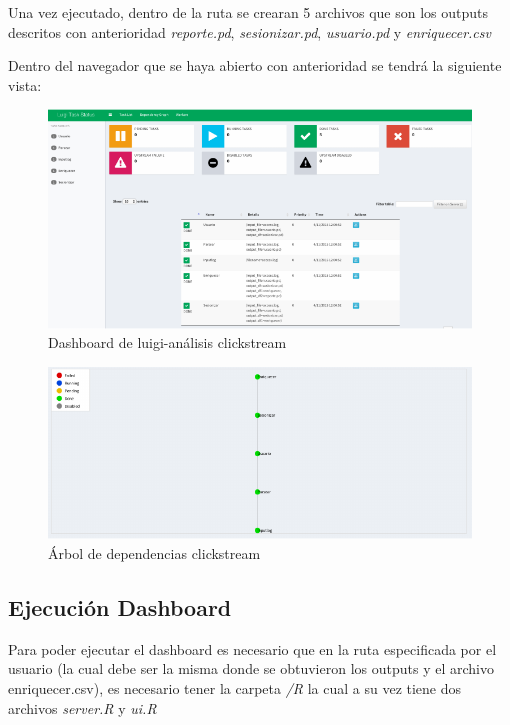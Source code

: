 Una vez ejecutado, dentro de la ruta se crearan 5 archivos que son los
outputs descritos con anterioridad \emph{reporte.pd},
\emph{sesionizar.pd}, \emph{usuario.pd} y \emph{enriquecer.csv}

Dentro del navegador que se haya abierto con anterioridad se tendrá la siguiente vista:

\begin{figure}[H]
\centering
\includegraphics[width=1\textwidth]{Figures/unnamed-chunk-2-1}
\caption{Dashboard de luigi-análisis clickstream}
\end{figure}

\begin{figure}[H]
\centering
\includegraphics[width=1\textwidth]{Figures/unnamed-chunk-3-1}
\caption{Árbol de dependencias clickstream}
\end{figure}



\subsection{ Ejecución Dashboard}\label{ejecucion-dashboard}

Para poder ejecutar el dashboard es necesario que en la ruta
especificada por el usuario (la cual debe ser la misma donde se
obtuvieron los outputs y el archivo enriquecer.csv), es necesario tener
la carpeta \emph{/R} la cual a su vez tiene dos archivos \emph{server.R}
y \emph{ui.R}

